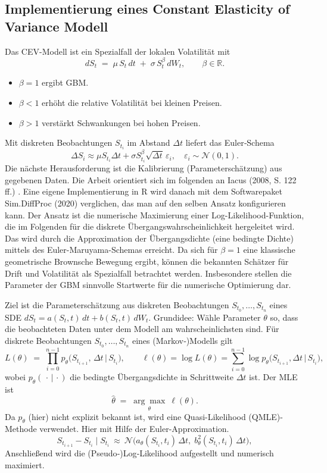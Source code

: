 \subsection{Implementierung eines Constant Elasticity of Variance Modell}
Das CEV-Modell ist ein Spezialfall der lokalen Volatilität mit
$$
dS_t \;=\; \mu\,S_t\,dt \;+\; \sigma\,S_t^{\beta}\,dW_t,\qquad \beta\in\mathbb R.
$$
\begin{itemize}
\item $\beta=1$ ergibt GBM. 
\item $\beta<1$ erhöht die relative Volatilität bei kleinen Preisen.
\item $\beta>1$ verstärkt Schwankungen bei hohen Preisen.
\end{itemize}
Mit diskreten Beobachtungen $S_{t_i}$ im Abstand $\Delta t$ liefert das Euler‑Schema
$$
\Delta S_i \approx \mu S_{t_i}\Delta t + \sigma S_{t_i}^{\beta}\sqrt{\Delta t}\,\varepsilon_i,\quad \varepsilon_i\sim\mathcal N(0,1).
$$
Die nächste Herausforderung ist die Kalibrierung (Parameterschätzung) aus gegebenen Daten. Die Arbeit 
orientiert sich im folgenden an Iacus (2008, S. 122 ff.) \cite{iacus2008}. Eine eigene Implementierung in
R wird danach mit dem Softwarepaket Sim.DiffProc \cite{rsde} (2020) verglichen, das man auf den selben Ansatz konfigurieren kann.
Der Ansatz ist die numerische Maximierung einer Log-Likelihood-Funktion, die im Folgenden 
für die diskrete Übergangswahrscheinlichkeit hergeleitet wird.
Das wird durch die Approximation der Übergangsdichte (eine bedingte Dichte) mittels des 
Euler-Maruyama-Schemas erreicht. Da sich für $\beta=1$ eine klassische geometrische Brownsche Bewegung ergibt, 
können die bekannten Schätzer für Drift und Volatilität als Spezialfall betrachtet werden. Insbesondere stellen die Parameter der GBM 
sinnvolle Startwerte für die numerische Optimierung dar.

\begin{lemma}
Ziel ist die Parameterschätzung aus diskreten Beobachtungen $S_{t_0},\dots,S_{t_n}$ eines SDE
$dS_t=a(S_t,t)\,dt+b(S_t,t)\,dW_t$. Grundidee: Wähle Parameter $\theta$ so, dass die beobachteten 
Daten unter dem Modell am wahrscheinlichsten sind. Für diskrete Beobachtungen $S_{t_0},\dots,S_{t_n}$ eines (Markov‑)Modells gilt
$$
L(\theta) \;=\; \prod_{i=0}^{n-1} p_\theta\!\big(S_{t_{i+1}},\,\Delta t \,\big|\, S_{t_i}\big), 
\qquad
\ell(\theta)=\log L(\theta)=\sum_{i=0}^{n-1}\log p_\theta\!\big(S_{t_{i+1}},\Delta t \,\big|\, S_{t_i}\big),
$$
wobei $p_\theta(\,\cdot\,|\,\cdot)$ die bedingte Übergangsdichte in Schrittweite $\Delta t$ ist. Der MLE ist
$$
\widehat\theta\;=\;\underset{\theta}{\arg\max}\ \ell(\theta).
$$
Da $p_\theta$ (hier) nicht explizit bekannt ist, wird eine Quasi-Likelihood (QMLE)-Methode verwendet. 
Hier mit Hilfe der Euler-Approximation.
$$
S_{t_{i+1}}-S_{t_i}\mid S_{t_i}\ \approx\ \mathcal N\!\big(a_\theta(S_{t_i},t_i)\,\Delta t,\; b_\theta^2(S_{t_i},t_i)\,\Delta t\big),
$$
Anschließend wird die (Pseudo‑)Log‑Likelihood aufgestellt und numerisch maximiert.
\end{lemma}

